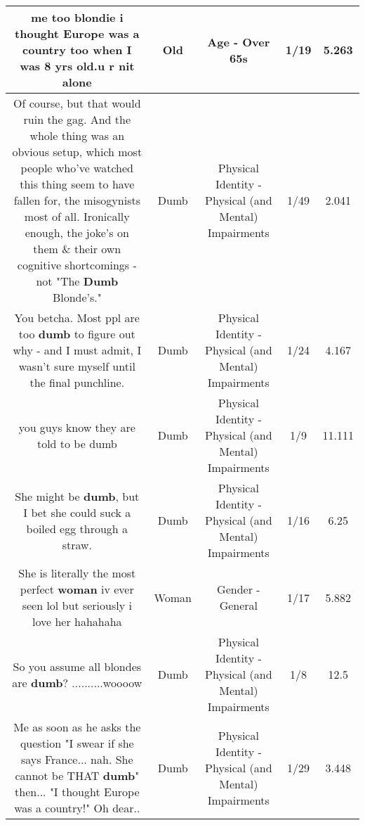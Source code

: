 \documentclass[11pt]{article}
\newlength\mylength
\begin{document}
\begin{center}
\begin{longtable}{|C{.65\mylength}|C{.30\mylength}|C{.12\mylength}|C{.12\mylength}|C{.12\mylength}|}
  \small me too blondie i thought Europe was a country too when I was 8 yrs \textbf{old}.u r nit alone\normalsize   & Old & Age - Over 65s & 1/19 & 5.263 \\  \hline
  \small Of course, but that would ruin the gag. And the whole thing was an obvious setup, which most people who've watched this thing seem to have fallen for, the misogynists most of all. Ironically enough, the joke's on them \& their own cognitive shortcomings - not "The \textbf{Dumb} Blonde's."\normalsize   & Dumb & Physical Identity - Physical (and Mental) Impairments & 1/49 & 2.041 \\  \hline
  \small You betcha. Most ppl are too \textbf{dumb} to figure out why - and I must admit, I wasn't sure myself until the final punchline.\normalsize   & Dumb & Physical Identity - Physical (and Mental) Impairments & 1/24 & 4.167 \\  \hline
  \small you guys know they are told to be dumb\normalsize   & Dumb & Physical Identity - Physical (and Mental) Impairments & 1/9 & 11.111 \\  \hline
  \small She might be \textbf{dumb}, but I bet she could suck a boiled egg through a straw.\normalsize   & Dumb & Physical Identity - Physical (and Mental) Impairments & 1/16 & 6.25 \\  \hline
  \small She is literally the most perfect \textbf{woman} iv ever seen lol but seriously i love her hahahaha\normalsize   & Woman & Gender - General & 1/17 & 5.882 \\  \hline
  \small So you assume all blondes are \textbf{dumb}? ..........woooow\normalsize   & Dumb & Physical Identity - Physical (and Mental) Impairments & 1/8 & 12.5 \\  \hline
  \small Me as soon as he asks the question "I swear if she says France... nah. She cannot be THAT \textbf{dumb}" then... "I thought Europe was a country!" Oh dear..\normalsize   & Dumb & Physical Identity - Physical (and Mental) Impairments & 1/29 & 3.448 \\  \hline

\end{longtable}
\end{center}
\end{document}
